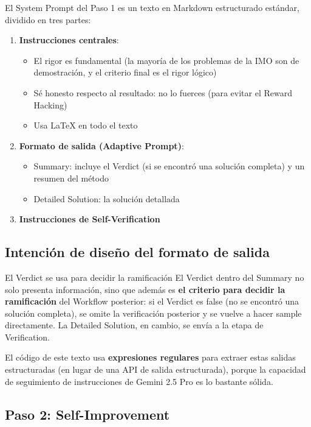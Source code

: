 \documentclass[a4paper]{article}
\begin{document}
El System Prompt del Paso 1 es un texto en Markdown estructurado estándar, dividido en tres partes:

\begin{enumerate}
    \item \textbf{Instrucciones centrales}:
    \begin{itemize}
        \item El rigor es fundamental (la mayoría de los problemas de la IMO son de demostración, y el criterio final es el rigor lógico)
        \item Sé honesto respecto al resultado: no lo fuerces (para evitar el Reward Hacking)
        \item Usa LaTeX en todo el texto
    \end{itemize}
    \item \textbf{Formato de salida (Adaptive Prompt)}:
    \begin{itemize}
        \item Summary: incluye el Verdict (si se encontró una solución completa) y un resumen del método
        \item Detailed Solution: la solución detallada
    \end{itemize}
    \item \textbf{Instrucciones de Self-Verification}
\end{enumerate}

\subsection{Intención de diseño del formato de salida}

\begin{importantbox}{El Verdict se usa para decidir la ramificación}
El Verdict dentro del Summary no solo presenta información, sino que además es \textbf{el criterio para decidir la ramificación} del Workflow posterior: si el Verdict es false (no se encontró una solución completa), se omite la verificación posterior y se vuelve a hacer sample directamente. La Detailed Solution, en cambio, se envía a la etapa de Verification.
\end{importantbox}

El código de este texto usa \textbf{expresiones regulares} para extraer estas salidas estructuradas (en lugar de una API de salida estructurada), porque la capacidad de seguimiento de instrucciones de Gemini 2.5 Pro es lo bastante sólida.

\subsection{Paso 2: Self-Improvement}
\end{document}
